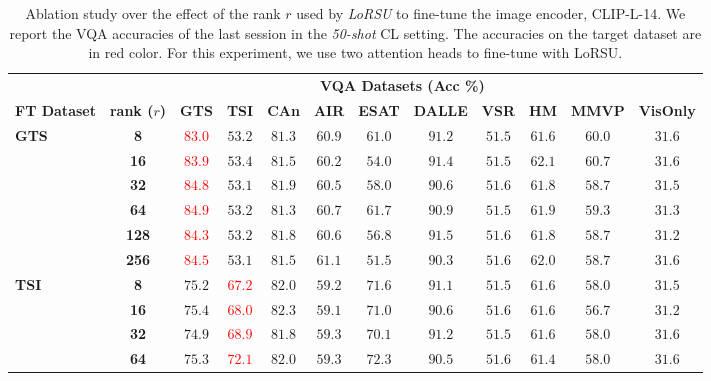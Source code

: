 \begin{table}
\caption{Ablation study over the effect of the rank $r$ used by \emph{LoRSU} to fine-tune the image encoder, CLIP-L-14. We report the VQA accuracies of the last session in the \emph{50-shot} CL setting. The accuracies on the target dataset are in red color. For this experiment, we use two attention heads to fine-tune with LoRSU.}
 \label{table:ablation_ranks}
\vskip 0.15in
\begin{center}
\begingroup
\setlength{\tabcolsep}{6.7pt}
\begin{tabular}{l c c c c c c c c c c c}
\toprule
 & & \multicolumn{9}{c}{\textbf{VQA Datasets (Acc \%)}}  \\
\cmidrule(lr){3-12}
\textbf{FT Dataset} & \textbf{rank ($r$)}  & \textbf{GTS} & \textbf{TSI} & \textbf{CAn} & \textbf{AIR} & \textbf{ESAT} & \textbf{DALLE} & \textbf{VSR} & \textbf{HM} & \textbf{MMVP} & \textbf{VisOnly} \\
\midrule
\multirow{6}{*}{\textbf{GTS}} & \textbf{8} & \textcolor{red}{$83.0$} & $53.2$ & $81.3$ & $60.9$ & $61.0$ & $91.2$ & $51.5$ & $61.6$ & $60.0$ & $31.6$ \\
 & \textbf{16} & \textcolor{red}{$83.9$} & $53.4$ & $81.5$ & $60.2$ & $54.0$ & $91.4$ & $51.5$ & $62.1$ & $60.7$ & $31.6$ \\
 & \textbf{32} & \textcolor{red}{$84.8$} & $53.1$ & $81.9$ & $60.5$ & $58.0$ & $90.6$ & $51.6$ & $61.8$ & $58.7$ & $31.5$ \\
 & \textbf{64} & \textcolor{red}{$84.9$} &  $53.2$ & $81.3$ & $60.7$ & $61.7$ & $90.9$ & $51.5$ & $61.9$ & $59.3$ & $31.3$ \\
 & \textbf{128} & \textcolor{red}{$84.3$} & $53.2$ & $81.8$ & $60.6$ & $56.8$ & $91.5$ & $51.6$ & $61.8$ & $58.7$ & $31.2$ \\
 & \textbf{256} & \textcolor{red}{$84.5$} & $53.1$ & $81.5$ & $61.1$ & $51.5$ & $90.3$ & $51.6$ & $62.0$ & $58.7$ & $31.6$ \\
\midrule
\multirow{6}{*}{\textbf{TSI}} & \textbf{8} & $75.2$ & \textcolor{red}{$67.2$} & $82.0$ & $59.2$ & $71.6$ & $91.1$ & $51.5$ & $61.6$ & $58.0$ & $31.5$ \\
 & \textbf{16} & $75.4$ & \textcolor{red}{$68.0$} & $82.3$ & $59.1$ & $71.0$ & $90.6$ & $51.6$ & $61.6$ & $56.7$ & $31.2$ \\
 & \textbf{32} & $74.9$ & \textcolor{red}{$68.9$} & $81.8$ & $59.3$ & $70.1$ & $91.2$ & $51.5$ & $61.6$ & $58.0$ & $31.6$ \\
 & \textbf{64} & $75.3$ & \textcolor{red}{$72.1$} & $82.0$ & $59.3$ & $72.3$ & $90.5$ & $51.6$ & $61.4$ & $58.0$ & $31.6$ \\

\end{tabular}
\end{center}
\end{table}
